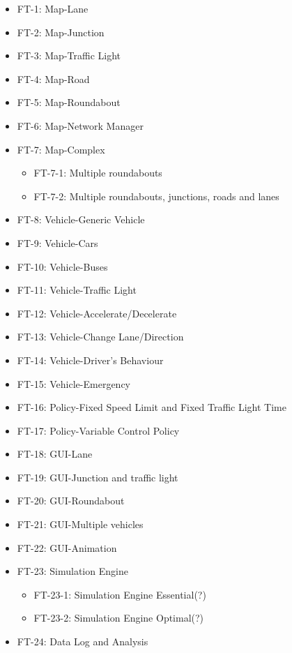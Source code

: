 \documentclass[11pt]{article}
\begin{document}
\begin{itemize}
    \begin{itemize}[noitemsep]
    	\item FT-1: Map-Lane
    	\item FT-2: Map-Junction
    	\item FT-3: Map-Traffic Light
    	\item FT-4: Map-Road
    	\item FT-5: Map-Roundabout
    	\item FT-6: Map-Network Manager
    	\item FT-7: Map-Complex
    		\begin{itemize}
        	\item FT-7-1: Multiple roundabouts
        	\item FT-7-2: Multiple roundabouts, junctions, roads and lanes
        	\end{itemize}
    	\item FT-8: Vehicle-Generic Vehicle
    	\item FT-9: Vehicle-Cars
    	\item FT-10: Vehicle-Buses
    	\item FT-11: Vehicle-Traffic Light
    	\item FT-12: Vehicle-Accelerate/Decelerate
    	\item FT-13: Vehicle-Change Lane/Direction
    	\item FT-14: Vehicle-Driver's Behaviour
    	\item FT-15: Vehicle-Emergency
    	\item FT-16: Policy-Fixed Speed Limit and Fixed Traffic Light Time
    	\item FT-17: Policy-Variable Control Policy
    	\item FT-18: GUI-Lane
    	\item FT-19: GUI-Junction and traffic light
    	\item FT-20: GUI-Roundabout
    	\item FT-21: GUI-Multiple vehicles
    	\item FT-22: GUI-Animation
    	\item FT-23: Simulation Engine
    	    \begin{itemize}
        	\item FT-23-1: Simulation Engine Essential(?)
        	\item FT-23-2: Simulation Engine Optimal(?)
        	\end{itemize}
    	\item FT-24: Data Log and Analysis
   \end{itemize}


\end{itemize}
\end{document}
